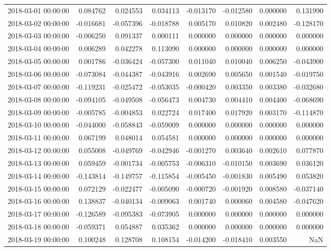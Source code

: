 \begin{tabular}{lrrrrrrr}
2018-03-01 00:00:00 & 0.084762 & 0.024553 & 0.034113 & -0.013170 & -0.012580 & 0.000000 & 0.131990 \\
2018-03-02 00:00:00 & -0.016681 & -0.057396 & -0.018788 & 0.005170 & 0.010820 & 0.002480 & -0.128170 \\
2018-03-03 00:00:00 & -0.006250 & 0.091337 & 0.000111 & 0.000000 & 0.000000 & 0.000000 & 0.000000 \\
2018-03-04 00:00:00 & 0.006289 & 0.042278 & 0.113090 & 0.000000 & 0.000000 & 0.000000 & 0.000000 \\
2018-03-05 00:00:00 & 0.001786 & -0.036424 & -0.057300 & 0.011040 & 0.010040 & 0.006250 & -0.043900 \\
2018-03-06 00:00:00 & -0.073084 & -0.044387 & -0.043916 & 0.002690 & 0.005650 & 0.001540 & -0.019750 \\
2018-03-07 00:00:00 & -0.119231 & -0.025472 & -0.053035 & -0.000420 & 0.003350 & 0.003380 & -0.032680 \\
2018-03-08 00:00:00 & -0.094105 & -0.049508 & -0.056473 & 0.004730 & 0.004410 & 0.004400 & -0.068690 \\
2018-03-09 00:00:00 & -0.005785 & -0.004853 & 0.022724 & 0.017400 & 0.017920 & 0.003170 & -0.114870 \\
2018-03-10 00:00:00 & -0.044000 & -0.058843 & -0.059009 & 0.000000 & 0.000000 & 0.000000 & 0.000000 \\
2018-03-11 00:00:00 & 0.067199 & 0.048014 & 0.054581 & 0.000000 & 0.000000 & 0.000000 & 0.000000 \\
2018-03-12 00:00:00 & 0.055008 & -0.049769 & -0.042946 & -0.001270 & 0.003640 & 0.002610 & 0.077870 \\
2018-03-13 00:00:00 & 0.059459 & -0.001734 & -0.005753 & -0.006310 & -0.010150 & 0.003690 & 0.036120 \\
2018-03-14 00:00:00 & -0.143814 & -0.149757 & -0.115854 & -0.005450 & -0.001830 & 0.005490 & 0.053820 \\
2018-03-15 00:00:00 & 0.072129 & -0.022477 & -0.005090 & -0.000720 & -0.001920 & 0.008580 & -0.037140 \\
2018-03-16 00:00:00 & 0.138837 & -0.040134 & -0.009063 & 0.001740 & 0.000060 & 0.004580 & -0.047620 \\
2018-03-17 00:00:00 & -0.126589 & -0.095383 & -0.073905 & 0.000000 & 0.000000 & 0.000000 & 0.000000 \\
2018-03-18 00:00:00 & -0.059371 & 0.054887 & 0.035362 & 0.000000 & 0.000000 & 0.000000 & 0.000000 \\
2018-03-19 00:00:00 & 0.100248 & 0.128708 & 0.108154 & -0.014200 & -0.018410 & 0.003550 & NaN \\

\end{tabular}
